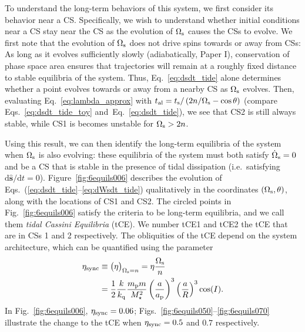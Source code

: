\documentclass[
        fleqn,
        usenatbib,
        referee,
    ]{mnras}
\newcommand*{\rdil}[2]{\mathrm{d}#1/\mathrm{d}#2}
\newcommand*{\p}[1]{\left(#1\right)}
\newcommand*{\uv}[1]{\hat{\boldsymbol{\mathbf{#1}}}}
\begin{document}
To understand the long-term behaviors of this system, we first consider its
behavior near a CS\@. Specifically, we wish to understand whether initial
conditions near a CS stay near the CS as the evolution of $\Omega_{\rm s}$
causes the CSs to evolve. We first note that the evolution of
$\Omega_{\rm s}$ does not drive spins towards or away from CSs: As long as it
evolves sufficiently slowly (adiabatically, Paper I), conservation of
phase space area ensures that trajectories will remain at a roughly fixed
distance to stable equilibria of the system. Thus, Eq.~\eqref{eq:dsdt_tide}
alone determines whether a point evolves towards or away from a nearby CS as
$\Omega_{\rm s}$ evolves. Then, evaluating Eq.~\eqref{eq:lambda_approx} with
$t_{\rm al} = t_{\rm s} / \p{2n / \Omega_{\rm s} - \cos \theta}$ (compare
Eqs.~\ref{eq:dsdt_tide_toy} and~Eq.~\ref{eq:dsdt_tide}), we see that CS2 is
still always stable, while CS1 is becomes unstable for $\Omega_{\rm s} > 2n$.

Using this result, we can then identify the long-term equilibria of the system
when $\Omega_{\rm s}$ is also evolving: these equilibria of the system must both
satisfy $\dot{\Omega}_{\rm s} = 0$ and be a CS that is stable in the presence of
tidal dissipation (i.e.\ satisfying $\rdil{\uv{s}}{t} = 0$).
Figure~\ref{fig:6equils006} describes the evolution of
Eqs.~(\ref{eq:dsdt_tide}--\ref{eq:dWsdt_tide}) qualitatively in the coordinates
$(\Omega_{\rm s}, \theta)$, along with the locations of CS1 and CS2. The circled
points in Fig.~\ref{fig:6equils006} satisfy the criteria to be long-term
equilibria, and we call them \emph{tidal Cassini Equilibria} (tCE). We number
tCE1 and tCE2 the tCE that are in CSs 1 and 2 respectively. The obliquities of
the tCE depend on the system architecture, which can be quantified using the
parameter
\begin{align}
    \eta_{\rm sync} &\equiv \big(\eta\big)_{\Omega_{\rm s} = n}
        = \eta \frac{\Omega_{\rm s}}{n}\nonumber\\
        &= \frac{1}{2}\frac{k}{k_{\rm q}}
            \frac{m_{\rm p}m}{M_\star^2}
            \p{\frac{a}{a_{\rm p}}}^3 \p{\frac{a}{R}}^3\cos(I).
            \label{eq:def_etasync}
\end{align}
In Fig.~\ref{fig:6equils006}, $\eta_{\rm sync} = 0.06$;
Figs.~\ref{fig:6equils050}--\ref{fig:6equils070} illustrate the change to the
tCE when $\eta_{\rm sync} = 0.5$ and $0.7$ respectively.
\end{document}
